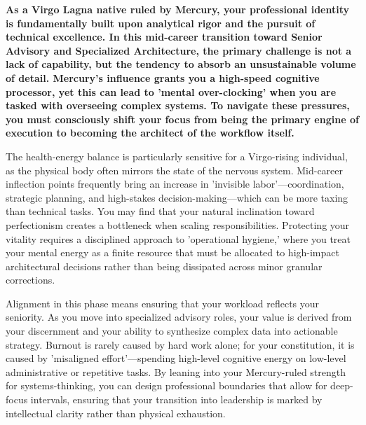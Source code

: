 
\label{topic39}

{\fontsize{9.5}{13.8}\selectfont\bfseries\color{DeepSlate} As a Virgo Lagna native ruled by Mercury, your professional identity is fundamentally built upon analytical rigor and the pursuit of technical excellence. In this mid-career transition toward Senior Advisory and Specialized Architecture, the primary challenge is not a lack of capability, but the tendency to absorb an unsustainable volume of detail. Mercury's influence grants you a high-speed cognitive processor, yet this can lead to 'mental over-clocking' when you are tasked with overseeing complex systems. To navigate these pressures, you must consciously shift your focus from being the primary engine of execution to becoming the architect of the workflow itself.}\par\vspace{2mm}

{\fontsize{9}{13}\selectfont The health-energy balance is particularly sensitive for a Virgo-rising individual, as the physical body often mirrors the state of the nervous system. Mid-career inflection points frequently bring an increase in 'invisible labor'---coordination, strategic planning, and high-stakes decision-making---which can be more taxing than technical tasks. You may find that your natural inclination toward perfectionism creates a bottleneck when scaling responsibilities. Protecting your vitality requires a disciplined approach to 'operational hygiene,' where you treat your mental energy as a finite resource that must be allocated to high-impact architectural decisions rather than being dissipated across minor granular corrections.}\par\vspace{1.8mm}

{\fontsize{9}{13}\selectfont Alignment in this phase means ensuring that your workload reflects your seniority. As you move into specialized advisory roles, your value is derived from your discernment and your ability to synthesize complex data into actionable strategy. Burnout is rarely caused by hard work alone; for your constitution, it is caused by 'misaligned effort'---spending high-level cognitive energy on low-level administrative or repetitive tasks. By leaning into your Mercury-ruled strength for systems-thinking, you can design professional boundaries that allow for deep-focus intervals, ensuring that your transition into leadership is marked by intellectual clarity rather than physical exhaustion.}\par\vspace{1.8mm}

